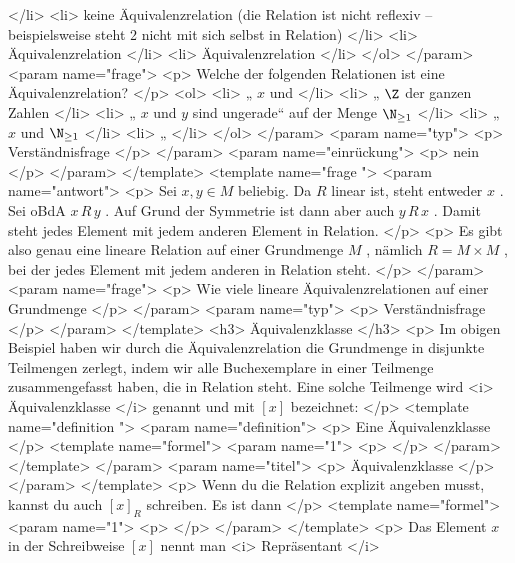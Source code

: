      </li>
     <li>
      keine Äquivalenzrelation (die Relation ist nicht reflexiv – beispielsweise steht 2 nicht mit sich selbst in Relation)
     </li>
     <li>
      Äquivalenzrelation
     </li>
     <li>
      Äquivalenzrelation
     </li>
    </ol>
   </param>
   <param name="frage">
    <p>
     Welche der folgenden Relationen ist eine Äquivalenzrelation?
    </p>
    <ol>
     <li>
      „
      $x$
      und
     </li>
     <li>
      „
      $\Z$
      der ganzen Zahlen
     </li>
     <li>
      „
      $x$
      und
      $y$
      sind ungerade“ auf der Menge
      $\N_{\ge1}$
     </li>
     <li>
      „
      $x$
      und
      $\N_{\ge1}$
     </li>
     <li>
      „
     </li>
    </ol>
   </param>
   <param name="typ">
    <p>
     Verständnisfrage
    </p>
   </param>
   <param name="einrückung">
    <p>
     nein
    </p>
   </param>
  </template>
  <template name="frage
 ">
   <param name="antwort">
    <p>
     Sei
     $x,y\in M$
     beliebig. Da
     $R$
     linear ist, steht entweder
     $x$
     . Sei oBdA
     $x\,R\,y$
     . Auf Grund der Symmetrie ist dann aber auch
     $y\,R\,x$
     . Damit steht jedes Element mit jedem anderen Element in Relation.
    </p>
    <p>
     Es gibt also genau eine lineare Relation auf einer Grundmenge
     $M$
     , nämlich
     $R=M\times M$
     , bei der jedes Element mit jedem anderen in Relation steht.
    </p>
   </param>
   <param name="frage">
    <p>
     Wie viele lineare Äquivalenzrelationen auf einer Grundmenge
    </p>
   </param>
   <param name="typ">
    <p>
     Verständnisfrage
    </p>
   </param>
  </template>
  <h3>
   Äquivalenzklasse
  </h3>
  <p>
   Im obigen Beispiel haben wir durch die Äquivalenzrelation die Grundmenge in disjunkte Teilmengen zerlegt, indem wir alle Buchexemplare in einer Teilmenge zusammengefasst haben, die in Relation steht. Eine solche Teilmenge wird
   <i>
    Äquivalenzklasse
   </i>
   genannt und mit
   $[x]$
   bezeichnet:
  </p>
  <template name="definition
 ">
   <param name="definition">
    <p>
     Eine Äquivalenzklasse
    </p>
    <template name="formel">
     <param name="1">
      <p>
      </p>
     </param>
    </template>
   </param>
   <param name="titel">
    <p>
     Äquivalenzklasse
    </p>
   </param>
  </template>
  <p>
   Wenn du die Relation explizit angeben musst, kannst du auch
   $[x]_R$
   schreiben. Es ist dann
  </p>
  <template name="formel">
   <param name="1">
    <p>
    </p>
   </param>
  </template>
  <p>
   Das Element
   $x$
   in der Schreibweise
   $[x]$
   nennt man
   <i>
    Repräsentant
   </i>
